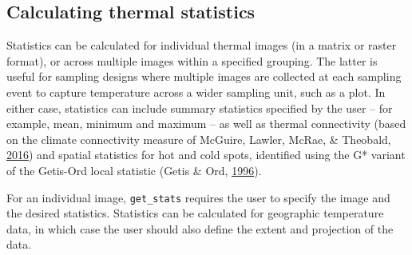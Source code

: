 \documentclass[12pt,british,a4paper,]{article}
\newenvironment{Shaded}{\begin{snugshade}}{\end{snugshade}}
\newcommand{\CommentTok}[1]{\textcolor[rgb]{0.56,0.35,0.01}{\textit{#1}}}
\newcommand{\DataTypeTok}[1]{\textcolor[rgb]{0.13,0.29,0.53}{#1}}
\newcommand{\NormalTok}[1]{#1}
\newcommand{\OperatorTok}[1]{\textcolor[rgb]{0.81,0.36,0.00}{\textbf{#1}}}
\newcommand{\OtherTok}[1]{\textcolor[rgb]{0.56,0.35,0.01}{#1}}
\newcommand{\StringTok}[1]{\textcolor[rgb]{0.31,0.60,0.02}{#1}}
\begin{document}
\begin{Shaded}
\end{Shaded}

\hypertarget{calculating-thermal-statistics}{%
\subsection{Calculating thermal statistics}\label{calculating-thermal-statistics}}

Statistics can be calculated for individual thermal images (in a matrix or raster format), or across multiple images within a specified grouping. The latter is useful for sampling designs where multiple images are collected at each sampling event to capture temperature across a wider sampling unit, such as a plot. In either case, statistics can include summary statistics specified by the user -- for example, mean, minimum and maximum -- as well as thermal connectivity (based on the climate connectivity measure of McGuire, Lawler, McRae, \& Theobald, \protect\hyperlink{ref-mcguire_achieving_2016}{2016}) and spatial statistics for hot and cold spots, identified using the G* variant of the Getis-Ord local statistic (Getis \& Ord, \protect\hyperlink{ref-getis_local_1996}{1996}).

For an individual image, \texttt{get\_stats} requires the user to specify the image and the desired statistics. Statistics can be calculated for geographic temperature data, in which case the user should also define the extent and projection of the data.
\end{document}
